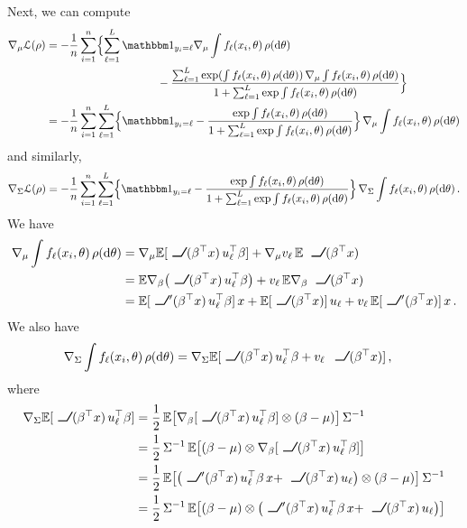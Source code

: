 \documentclass{custom}
\begin{document}
Next, we can compute
\begin{align*}
\nabla_{\mu}\loss(\rho)
& =-\frac{1}{n}\sum_{i=1}^{n}\Bigl\{ \sum_{\ell=1}^{L}\ind_{y_{i}=\ell}\nabla_{\mu}\int f_{\ell}(x_{i},\theta)\,\rho(\D\theta)\\
&\qquad\qquad\qquad\qquad\qquad{} -\frac{\sum_{\ell=1}^{L}\exp(\int f_{\ell}(x_{i},\theta)\,\rho(\D\theta))\,\nabla_{\mu}\int f_{\ell}(x_{i},\theta)\,\rho(\D\theta)}{1+\sum_{\ell=1}^{L}\exp\int f_{\ell}(x_{i},\theta)\,\rho(\D\theta)}\Bigr\} \\
 & =-\frac{1}{n}\sum_{i=1}^{n}\sum_{\ell=1}^{L}\Bigl\{ \ind_{y_{i}=\ell}-\frac{\exp\int f_{\ell}(x_{i},\theta)\,\rho(\D\theta)}{1+\sum_{\ell=1}^{L}\exp\int f_{\ell}(x_{i},\theta)\,\rho(\D\theta)}\Bigr\}\, \nabla_{\mu}\int f_{\ell}(x_{i},\theta)\,\rho(\D\theta)
\end{align*}
and similarly,
\[
\nabla_{\Sigma}\loss(\rho)=-\frac{1}{n}\sum_{i=1}^{n}\sum_{\ell=1}^{L}\Bigl\{ \ind_{y_{i}=\ell}-\frac{\exp\int f_{\ell}(x_{i},\theta)\,\rho(\D\theta)}{1+\sum_{\ell=1}^{L}\exp\int f_{\ell}(x_{i},\theta)\,\rho(\D\theta)}\Bigr\}\, \nabla_{\Sigma}\int f_{\ell}(x_{i},\theta)\,\rho(\D\theta)\,.
\]
We have
\begin{align*}
\nabla_{\mu}\int f_{\ell}(x_{i},\theta)\,\rho(\D\theta) & =\nabla_{\mu}\mathbb{E}[\ReLU(\beta^\top x )\,u_{\ell}^{\top}\beta]+\nabla_{\mu}v_{\ell}\,\mathbb{E}\ReLU(\beta^\top x )\\
 & =\mathbb{E}\nabla_{\beta}\bigl(\ReLU(\beta^\top x )\,u_{\ell}^{\top}\beta\bigr)+v_{\ell}\,\mathbb{E} \nabla_{\beta}\ReLU(\beta^\top x )\\
 & =\mathbb{E}[\ReLU'(\beta^\top x )\,u_{\ell}^{\top}\beta]\,x+\mathbb{E}[\ReLU(\beta^\top x )]\,u_{\ell}+v_{\ell}\,\mathbb{E}[\ReLU'(\beta^\top x )]\,x\,.
\end{align*}
We also have
\begin{align*}
\nabla_{\Sigma}\int f_{\ell}(x_{i},\theta)\,\rho(\D\theta) & =\nabla_{\Sigma}\mathbb{E}[\ReLU(\beta^\top x )\,u_{\ell}^{\top}\beta+v_{\ell}\,\ReLU(\beta^\top x )]\,,
\end{align*}
where
\begin{align*}
\nabla_{\Sigma}\mathbb{E}[\ReLU(\beta^\top x )\,u_{\ell}^{\top}\beta]
& =\frac{1}{2}\,\mathbb{E}\bigl[\nabla_{\beta}[\ReLU(\beta^\top x )\,u_{\ell}^{\top}\beta]\otimes(\beta-\mu)\bigr]\,\Sigma^{-1} \\
&=\frac{1}{2}\,\Sigma^{-1}\,\mathbb{E}\bigl[(\beta-\mu)\otimes\nabla_{\beta}[\ReLU(\beta^\top x )\,u_{\ell}^{\top}\beta]\bigr]\\
 & =\frac{1}{2}\,\mathbb{E}\bigl[\bigl(\ReLU'(\beta^\top x )\,u_{\ell}^{\top}\beta\,x+\ReLU(\beta^\top x )\,u_{\ell}\bigr)\otimes(\beta-\mu)\bigr]\,\Sigma^{-1}\\
 &=\frac{1}{2}\,\Sigma^{-1}\,\mathbb{E}\bigl[(\beta-\mu)\otimes\bigl(\ReLU'(\beta^\top x )\,u_{\ell}^{\top}\beta\,x+\ReLU(\beta^\top x )\,u_{\ell}\bigr)\bigr]
\end{align*}
\end{document}

